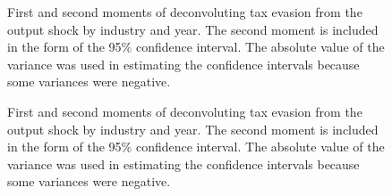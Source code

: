 \documentclass[
  12pt]{article}
\theoremstyle{definition}
\theoremstyle{remark}
\begin{document}
\begin{figure}


\caption{\label{fig-deconv-mmt-year-3}First and second moments of
deconvoluting tax evasion from the output shock by industry and year.
The second moment is included in the form of the 95\% confidence
interval. The absolute value of the variance was used in estimating the
confidence intervals because some variances were negative.}

\end{figure}%

\begin{figure}


\caption{\label{fig-deconv-mmt-year-4}First and second moments of
deconvoluting tax evasion from the output shock by industry and year.
The second moment is included in the form of the 95\% confidence
interval. The absolute value of the variance was used in estimating the
confidence intervals because some variances were negative.}

\end{figure}%
\end{document}
